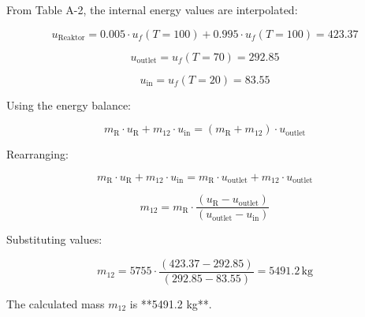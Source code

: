 From Table A-2, the internal energy values are interpolated:  

\[
u_{\text{Reaktor}} = 0.005 \cdot u_f(T=100) + 0.995 \cdot u_f(T=100) = 423.37
\]

\[
u_{\text{outlet}} = u_f(T=70) = 292.85
\]

\[
u_{\text{in}} = u_f(T=20) = 83.55
\]

Using the energy balance:  

\[
m_{\text{R}} \cdot u_{\text{R}} + m_{12} \cdot u_{\text{in}} = (m_{\text{R}} + m_{12}) \cdot u_{\text{outlet}}
\]

Rearranging:  

\[
m_{\text{R}} \cdot u_{\text{R}} + m_{12} \cdot u_{\text{in}} = m_{\text{R}} \cdot u_{\text{outlet}} + m_{12} \cdot u_{\text{outlet}}
\]

\[
m_{12} = m_{\text{R}} \cdot \frac{(u_{\text{R}} - u_{\text{outlet}})}{(u_{\text{outlet}} - u_{\text{in}})}
\]

Substituting values:  

\[
m_{12} = 5755 \cdot \frac{(423.37 - 292.85)}{(292.85 - 83.55)} = 5491.2 \, \text{kg}
\]  

The calculated mass \( m_{12} \) is **5491.2 kg**.